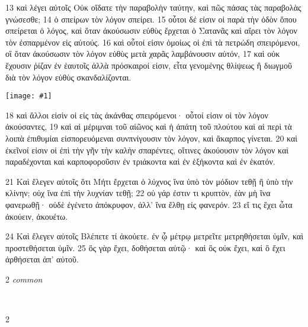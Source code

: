 \documentclass[10pt,a5paper,twoside,twocolumn]{book}
\newcommand{\fig}[1]{\texttt{[image: \#1]}\label{fig:#1}}
\newcommand*\cleartoleftpage{%
  \ifodd\value{page}\hbox{}\clearpage\fi
}
\newcommand{\separator}{
  \vspace{-0.5\baselineskip}%
  \hspace{0.27\textwidth}%
  \noindent\makebox[\linewidth]{\resizebox{0.3333\linewidth}{1pt}{$\bullet$}}\bigskip%
  \vspace{-0.5\baselineskip}
}
\newenvironment{facing}{\cleartoleftpage}{\clearpage\pagebreak}
\newenvironment{help}{\clearpage}{}
\newenvironment{helpsec}{\begin{minipage}[t]{\textwidth}\begin{multicols}{2}}{\end{multicols}\end{minipage}}
\newenvironment{vocab}{\begin{helpsec}}{\end{helpsec}}
\newenvironment{translation}{\separator\\\begin{helpsec}\footnotesize}{\end{helpsec}}
\begin{document}

\begin{facing}

13 καὶ λέγει αὐτοῖς Οὐκ οἴδατε τὴν παραβολὴν ταύτην, καὶ πῶς πάσας τὰς παραβολὰς γνώσεσθε; 14 ὁ σπείρων τὸν λόγον σπείρει. 15 οὗτοι δέ εἰσιν οἱ παρὰ τὴν ὁδὸν ὅπου σπείρεται ὁ λόγος, καὶ ὅταν ἀκούσωσιν εὐθὺς ἔρχεται ὁ Σατανᾶς καὶ αἴρει τὸν λόγον τὸν ἐσπαρμένον εἰς αὐτούς. 16 καὶ οὗτοί εἰσιν ὁμοίως οἱ ἐπὶ τὰ πετρώδη σπειρόμενοι, οἳ ὅταν ἀκούσωσιν τὸν λόγον εὐθὺς μετὰ χαρᾶς λαμβάνουσιν αὐτόν, 17 καὶ οὐκ ἔχουσιν ῥίζαν ἐν ἑαυτοῖς ἀλλὰ πρόσκαιροί εἰσιν, εἶτα γενομένης θλίψεως ἢ διωγμοῦ διὰ τὸν λόγον εὐθὺς σκανδαλίζονται. 

\fig{04-19} %

18 καὶ ἄλλοι εἰσὶν οἱ εἰς τὰς ἀκάνθας σπειρόμενοι· οὗτοί εἰσιν οἱ τὸν λόγον ἀκούσαντες, 19 καὶ αἱ μέριμναι τοῦ αἰῶνος καὶ ἡ ἀπάτη τοῦ πλούτου καὶ αἱ περὶ τὰ λοιπὰ ἐπιθυμίαι εἰσπορευόμεναι συνπνίγουσιν τὸν λόγον, καὶ ἄκαρπος γίνεται. 20 καὶ ἐκεῖνοί εἰσιν οἱ ἐπὶ τὴν γῆν τὴν καλὴν σπαρέντες, οἵτινες ἀκούουσιν τὸν λόγον καὶ παραδέχονται καὶ καρποφοροῦσιν ἐν τριάκοντα καὶ ἐν ἑξήκοντα καὶ ἐν ἑκατόν. 

\vfill

21 Καὶ ἔλεγεν αὐτοῖς ὅτι Μήτι ἔρχεται ὁ λύχνος ἵνα ὑπὸ τὸν μόδιον τεθῇ ἢ ὑπὸ τὴν κλίνην; οὐχ ἵνα ἐπὶ τὴν λυχνίαν τεθῇ; 22 οὐ γάρ ἐστιν τι κρυπτὸν, ἐὰν μὴ ἵνα φανερωθῇ· οὐδὲ ἐγένετο ἀπόκρυφον, ἀλλ’ ἵνα ἔλθῃ εἰς φανερόν. 23 εἴ τις ἔχει ὦτα ἀκούειν, ἀκουέτω. 

\vfill

24 Καὶ ἔλεγεν αὐτοῖς Βλέπετε τί ἀκούετε. ἐν ᾧ μέτρῳ μετρεῖτε μετρηθήσεται ὑμῖν, καὶ προστεθήσεται ὑμῖν. 25 ὃς γὰρ ἔχει, δοθήσεται αὐτῷ· καὶ ὃς οὐκ ἔχει, καὶ ὃ ἔχει ἀρθήσεται ἀπ’ αὐτοῦ. 


\begin{help}
\begin{vocab}
\emph{common}\\

\end{vocab}
\begin{translation}

\end{translation}
\end{help}
\end{facing}

\end{document}
